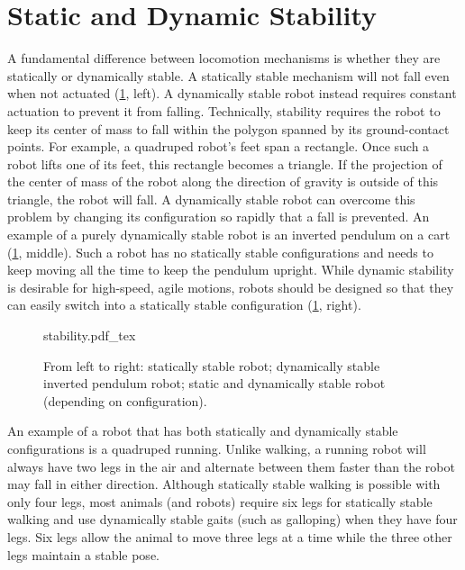\section{Static and Dynamic Stability}\label{sec:stability}

A fundamental difference between locomotion mechanisms is whether they are statically or dynamically stable. A statically stable mechanism will not fall even when not actuated (\cref{fig:stability}, left). A dynamically stable robot instead requires constant actuation to prevent it from falling. Technically, stability requires the robot to keep its center of mass to fall within the polygon spanned by its ground-contact points. For example, a quadruped robot's feet span a rectangle. Once such a robot lifts one of its feet, this rectangle becomes a triangle. If the projection of the center of mass of the robot along the direction of gravity is outside of this triangle, the robot will fall. A dynamically stable robot can overcome this problem by changing its configuration so rapidly that a fall is prevented. An example of a purely dynamically stable robot is an inverted pendulum on a cart (\cref{fig:stability}, middle). Such a robot has no statically stable configurations and needs to keep moving all the time to keep the pendulum upright. While dynamic stability is desirable for high-speed, agile motions, robots should be designed so that they can easily switch into a statically stable configuration (\cref{fig:stability}, right).

\begin{figure}
    \centering
    \def\svgwidth{\textwidth}
    {stability.pdf_tex}
    \caption{From left to right: statically stable robot; dynamically stable inverted pendulum robot; static and dynamically stable robot (depending on configuration).}
    \label{fig:stability}
\end{figure}

An example of a robot that has both statically and dynamically stable configurations is a quadruped running. Unlike walking, a running robot will always have two legs in the air and alternate between them faster than the robot may fall in either direction. Although statically stable walking is possible with only four legs, most animals (and robots) require six legs for statically stable walking and use dynamically stable gaits (such as galloping) when they have four legs. Six legs allow the animal to move three legs at a time while the three other legs maintain a stable pose.


